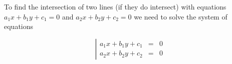 \begin{frame}
To find the intersection of two lines  (if they do intersect) with equations $a_1x+b_1y+c_1=0$ and $a_2x+b_2y+c_2=0$ we need to solve the system of equations

\[
\left|\begin{array}{rcl}
a_1x+b_1y+c_1&=&0\\
a_2x+b_2y+c_2&=&0
\end{array}\right.
\]
\end{frame}